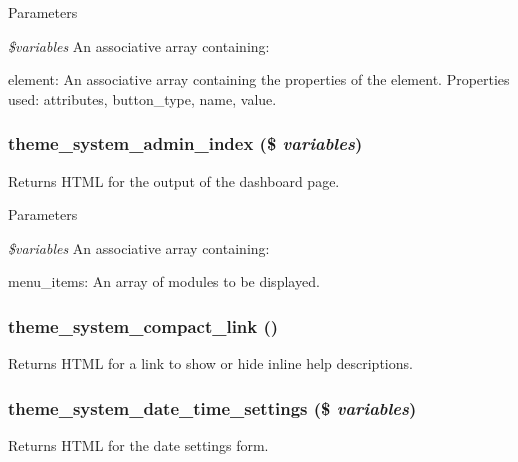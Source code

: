 \begin{DoxyParams}{Parameters}
\item[{\em \$variables}]An associative array containing:
\begin{DoxyItemize}
\item element: An associative array containing the properties of the element. Properties used: attributes, button\_\-type, name, value. 
\end{DoxyItemize}\end{DoxyParams}
\hypertarget{group__themeable_gacd2298d618d9cadea5727104a81ef499}{
\subsubsection[{theme\_\-system\_\-admin\_\-index}]{\setlength{\rightskip}{0pt plus 5cm}theme\_\-system\_\-admin\_\-index (\$ {\em variables})}}
\label{group__themeable_gacd2298d618d9cadea5727104a81ef499}
Returns HTML for the output of the dashboard page.


\begin{DoxyParams}{Parameters}
\item[{\em \$variables}]An associative array containing:
\begin{DoxyItemize}
\item menu\_\-items: An array of modules to be displayed. 
\end{DoxyItemize}\end{DoxyParams}
\hypertarget{group__themeable_gab5d8809d11a9e2ee4b06c8f14f8258f3}{
\subsubsection[{theme\_\-system\_\-compact\_\-link}]{\setlength{\rightskip}{0pt plus 5cm}theme\_\-system\_\-compact\_\-link ()}}
\label{group__themeable_gab5d8809d11a9e2ee4b06c8f14f8258f3}
Returns HTML for a link to show or hide inline help descriptions. \hypertarget{group__themeable_ga1d104bb4af90ef4212f7fb5c545ded92}{
\subsubsection[{theme\_\-system\_\-date\_\-time\_\-settings}]{\setlength{\rightskip}{0pt plus 5cm}theme\_\-system\_\-date\_\-time\_\-settings (\$ {\em variables})}}
\label{group__themeable_ga1d104bb4af90ef4212f7fb5c545ded92}
Returns HTML for the date settings form.


